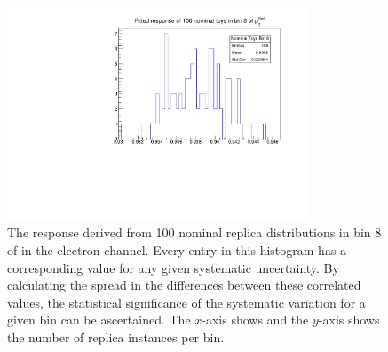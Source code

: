 \begin{figure}[t]
\centering
\includegraphics[width=0.8\textwidth]{plots/insitu/Nominal_response_toys_bin8.pdf}
\caption{The \rdb response derived from 100 nominal replica distributions in bin 8 of \ptref in the electron channel. Every entry in this histogram has a corresponding value for any given systematic uncertainty. By calculating the spread in the differences between these correlated values, the statistical significance of the systematic variation for a given bin can be ascertained. The $x$-axis shows \ptref and the $y$-axis shows the number of replica instances per bin.\label{fig:insitu:replicas}}
\end{figure}

